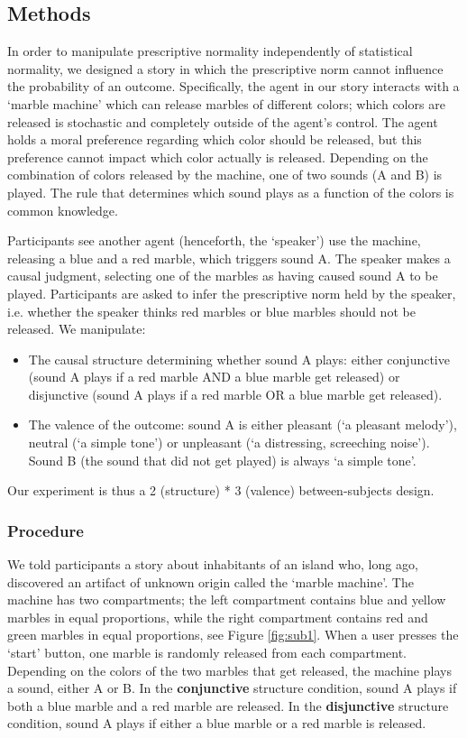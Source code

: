 \documentclass[fleqn,reqno,10pt]{article}
\begin{document}
\subsection{Methods}
In order to manipulate prescriptive normality independently of statistical normality, we designed a story in which the prescriptive norm cannot influence the probability of an outcome. Specifically, the agent in our story interacts with a `marble machine' which can release marbles of different colors; which colors are released is stochastic and completely outside of the agent's control. The agent holds a moral preference regarding which color should be released, but this preference cannot impact which color actually is released. Depending on the combination of colors released by the machine, one of two sounds (A and B) is played. The rule that determines which sound plays as a function of the colors is common knowledge.

Participants see another agent (henceforth, the `speaker') use the machine, releasing a blue and a red marble, which triggers sound A. The speaker makes a causal judgment, selecting one of the marbles as having caused sound A to be played. Participants are asked to infer the prescriptive norm held by the speaker, i.e. whether the speaker thinks red marbles or blue marbles should not be released. We manipulate:
\begin{itemize}
\item The causal structure determining whether sound A plays: either conjunctive (sound A plays if a red marble AND a blue marble get released) or disjunctive (sound A plays if a red marble OR a blue marble get released).

\item The valence of the outcome: sound A is either pleasant (`a pleasant melody'), neutral (`a simple tone') or unpleasant (`a distressing, screeching noise'). Sound B (the sound that did not get played) is always `a simple tone'.

\end{itemize}


Our experiment is thus a 2 (structure) * 3 (valence) between-subjects design.

\subsubsection{Procedure}

We told participants a story about inhabitants of an island who, long ago, discovered an artifact of unknown origin called the `marble machine'. The machine has two compartments; the left compartment contains blue and yellow marbles in equal proportions, while the right compartment contains red and green marbles in equal proportions, see Figure \ref{fig:sub1}. When a user presses the `start' button, one marble is randomly released from each compartment. Depending on the colors of the two marbles that get released, the machine plays a sound, either A or B. In the \textbf{conjunctive} structure condition, sound A plays if both a blue marble and a red marble are released. In the \textbf{disjunctive} structure condition, sound A plays if either a blue marble or a red marble is released.
\end{document}
